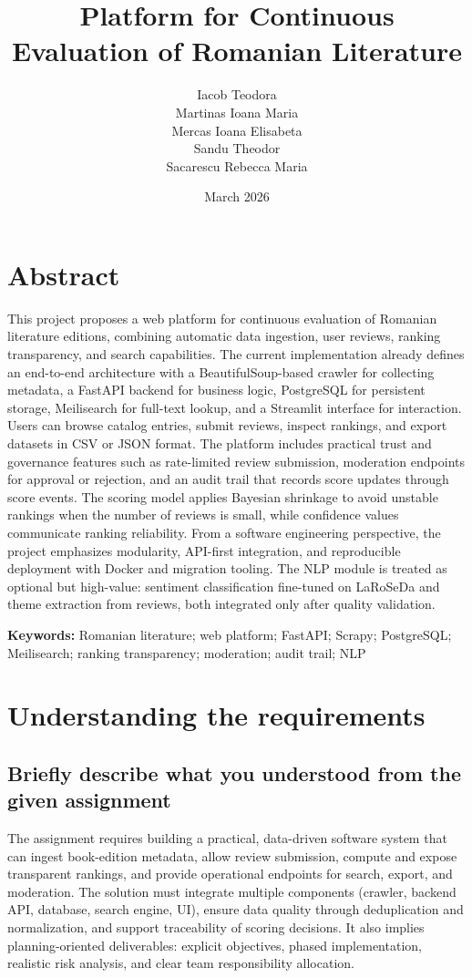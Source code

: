 \documentclass[12pt,a4paper]{article}
\title{Platform for Continuous Evaluation of Romanian Literature}
\author{
Iacob Teodora\\
Martinas Ioana Maria\\
Mercas Ioana Elisabeta\\
Sandu Theodor\\
Sacarescu Rebecca Maria
}
\date{March 2026}
\begin{document}
\maketitle

\section*{Abstract}
This project proposes a web platform for continuous evaluation of Romanian literature editions, combining automatic data ingestion, user reviews, ranking transparency, and search capabilities. The current implementation already defines an end-to-end architecture with a BeautifulSoup-based crawler for collecting metadata, a FastAPI backend for business logic, PostgreSQL for persistent storage, Meilisearch for full-text lookup, and a Streamlit interface for interaction. Users can browse catalog entries, submit reviews, inspect rankings, and export datasets in CSV or JSON format. The platform includes practical trust and governance features such as rate-limited review submission, moderation endpoints for approval or rejection, and an audit trail that records score updates through score events. The scoring model applies Bayesian shrinkage to avoid unstable rankings when the number of reviews is small, while confidence values communicate ranking reliability. From a software engineering perspective, the project emphasizes modularity, API-first integration, and reproducible deployment with Docker and migration tooling. The NLP module is treated as optional but high-value: sentiment classification fine-tuned on LaRoSeDa and theme extraction from reviews, both integrated only after quality validation.

\noindent\textbf{Keywords:} Romanian literature; web platform; FastAPI; Scrapy; PostgreSQL; Meilisearch; ranking transparency; moderation; audit trail; NLP

\section{Understanding the requirements}

\subsection{Briefly describe what you understood from the given assignment}
The assignment requires building a practical, data-driven software system that can ingest book-edition metadata, allow review submission, compute and expose transparent rankings, and provide operational endpoints for search, export, and moderation. The solution must integrate multiple components (crawler, backend API, database, search engine, UI), ensure data quality through deduplication and normalization, and support traceability of scoring decisions. It also implies planning-oriented deliverables: explicit objectives, phased implementation, realistic risk analysis, and clear team responsibility allocation.
\end{document}
